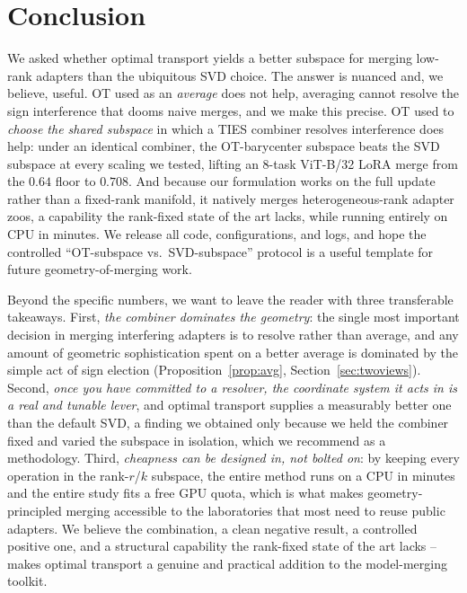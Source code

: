 \documentclass[11pt]{article}
\begin{document}
\section{Conclusion}
\label{sec:conclusion}
We asked whether optimal transport yields a better subspace for merging low-rank adapters than the
ubiquitous SVD choice. The answer is nuanced and, we believe, useful. OT used as an \emph{average} does
not help, averaging cannot resolve the sign interference that dooms naive merges, and we make this
precise. OT used to \emph{choose the shared subspace} in which a TIES combiner resolves interference does
help: under an identical combiner, the OT-barycenter subspace beats the SVD subspace at every scaling we
tested, lifting an $8$-task ViT-B/32 LoRA merge from the $0.64$ floor to $0.708$. And because our
formulation works on the full update rather than a fixed-rank manifold, it natively merges
heterogeneous-rank adapter zoos, a capability the rank-fixed state of the art lacks, while running
entirely on CPU in minutes. We release all code, configurations, and logs, and hope the controlled
``OT-subspace vs.\ SVD-subspace'' protocol is a useful template for future geometry-of-merging work.

Beyond the specific numbers, we want to leave the reader with three transferable takeaways. First,
\emph{the combiner dominates the geometry}: the single most important decision in merging interfering
adapters is to resolve rather than average, and any amount of geometric sophistication spent on a better
average is dominated by the simple act of sign election (Proposition~\ref{prop:avg},
Section~\ref{sec:twoviews}). Second, \emph{once you have committed to a resolver, the coordinate system it
acts in is a real and tunable lever}, and optimal transport supplies a measurably better one than the
default SVD, a finding we obtained only because we held the combiner fixed and varied the subspace in
isolation, which we recommend as a methodology. Third, \emph{cheapness can be designed in, not bolted on}:
by keeping every operation in the rank-$r$/$k$ subspace, the entire method runs on a CPU in minutes and
the entire study fits a free GPU quota, which is what makes geometry-principled merging accessible to the
laboratories that most need to reuse public adapters. We believe the combination, a clean negative
result, a controlled positive one, and a structural capability the rank-fixed state of the art lacks --
makes optimal transport a genuine and practical addition to the model-merging toolkit.



\end{document}

